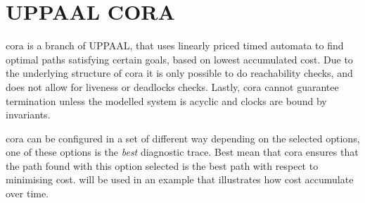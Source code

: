 \section{UPPAAL CORA} \label{sec:upp_cora}
\acrfull{cora} is a branch of UPPAAL, that uses linearly priced timed automata to find optimal paths satisfying certain goals, based on lowest accumulated cost\cite{cs_cora}. Due to the underlying structure of \gls{cora} it is only possible to do reachability checks, and does not allow for liveness or deadlocks checks. Lastly, \gls{cora} cannot guarantee termination unless the modelled system is acyclic and clocks are bound by invariants\cite{uppaal_cora_download}\cite{cora_tutorial}.

\gls{cora} can be configured in a set of different way depending on the selected options, one of these options is the \textit{best} diagnostic trace. 
Best mean that \gls{cora} ensures that the path found with this option selected is the best path with respect to minimising cost.
 will be used in an example that illustrates how cost accumulate over time.

